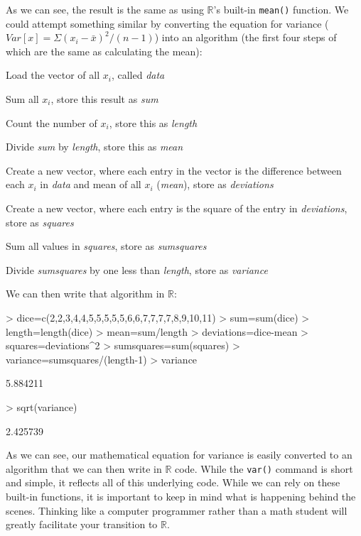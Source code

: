 \documentclass[12pt]{article}
\begin{document}
As we can see, the result is the same as using $\mathbb{R}$'s built-in \verb|mean()| function. We could attempt something similar by converting the equation for variance ($Var[x]=\Sigma (x_{i} - \bar{x})^2 / (n-1)$) into an algorithm (the first four steps of which are the same as calculating the mean):
\begin{enumerate*}
\item Load the vector of all $x_i$, called \emph{data}
\item Sum all $x_i$, store this result as \emph{sum}
\item Count the number of $x_i$, store this as \emph{length}
\item Divide \emph{sum} by \emph{length}, store this as \emph{mean}
\item Create a new vector, where each entry in the vector is the difference between each $x_i$ in \emph{data} and mean of all $x_i$ (\emph{mean}),  store as \emph{deviations}
\item Create a new vector, where each entry is the square of the entry in \emph{deviations}, store as \emph{squares}
\item Sum all values in \emph{squares}, store as \emph{sumsquares}
\item Divide \emph{sumsquares} by one less than \emph{length}, store as \emph{variance}
\end{enumerate*}
We can then write that algorithm in $\mathbb{R}$:
\begin{Schunk}
\begin{Sinput}
> dice=c(2,2,3,4,4,5,5,5,5,5,6,6,7,7,7,7,8,9,10,11)
> sum=sum(dice)
> length=length(dice)
> mean=sum/length
> deviations=dice-mean
> squares=deviations^2
> sumsquares=sum(squares)
> variance=sumsquares/(length-1)
> variance
\end{Sinput}
\begin{Soutput}
[1] 5.884211
\end{Soutput}
\begin{Sinput}
> sqrt(variance)
\end{Sinput}
\begin{Soutput}
[1] 2.425739
\end{Soutput}
\end{Schunk}

As we can see, our mathematical equation for variance is easily converted to an algorithm that we can then write in $\mathbb{R}$ code. While the \verb|var()| command is short and simple, it reflects all of this underlying code. While we can rely on these built-in functions, it is important to keep in mind what is happening behind the scenes. Thinking like a computer programmer rather than a math student will greatly facilitate your transition to $\mathbb{R}$.
\end{document}
